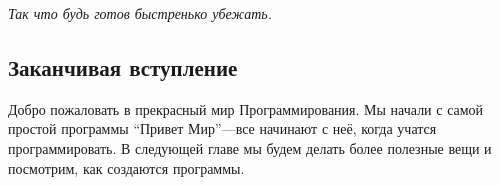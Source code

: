 \noindent
\emph{Так что будь готов быстренько убежать.}

\subsection*{\color{BrickRed}Заканчивая вступление}

Добро пожаловать в прекрасный мир Программирования.  Мы начали с самой простой программы ``Привет Мир''---все начинают с неё, когда учатся программировать.
В следующей главе мы будем делать более полезные вещи и посмотрим, как создаются программы.

\newpage